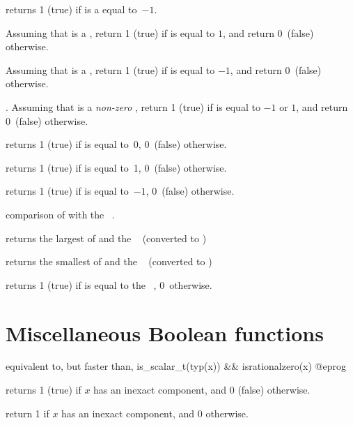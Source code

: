  returns 1 (true) if  is a 
equal to~$-1$.

Assuming that  is a , return 1 (true) if  is equal to
$1$, and return 0~(false) otherwise.

Assuming that  is a , return 1 (true) if  is equal to
$-1$, and return 0~(false) otherwise.

. Assuming that  is a
\emph{non-zero} , return 1 (true) if  is equal to $-1$ or
$1$, and return 0~(false) otherwise.

 returns 1 (true) if  is equal to~0, 0~(false)
otherwise.

 returns 1 (true) if  is equal to~1, 0~(false)
otherwise.

 returns 1 (true) if  is equal to~$-1$,
0~(false) otherwise.



 comparison of  with the
~.


 returns the largest of  and
the ~ (converted to )


 returns the smallest of  and the
~ (converted to )


 returns 1 (true) if  is equal to
the ~, 0~otherwise.

\section{Miscellaneous Boolean functions}

 equivalent to, but faster than,
\bprog
  is_scalar_t(typ(x)) && isrationalzero(x)
@eprog

 returns 1 (true) if $x$ has an inexact
component, and 0 (false) otherwise.

 return 1 if $x$ has an inexact
 component, and 0  otherwise.


